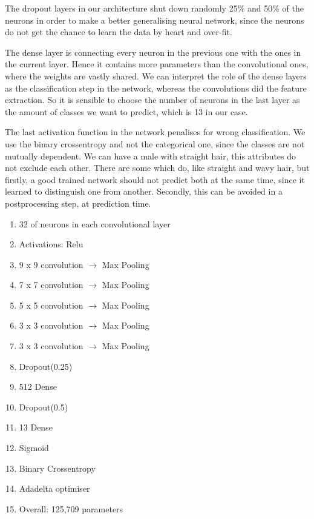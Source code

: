 \documentclass[12.5pt]{scrartcl}
\begin{document}
	The dropout layers in our architecture shut down randomly 25\% and 50\% of the neurons in order to make a better generalising neural network, since the neurons do not get the chance to learn the data by heart and over-fit.
	
	The dense layer is connecting every neuron in the previous one with the ones in the current layer. Hence it contains more parameters than the convolutional ones, where the weights are vastly shared. We can interpret the role of the dense layers as the classification step in the network, whereas the convolutions did the feature extraction. So it is sensible to choose the number of neurons in the last layer as the amount of classes we want to predict, which is 13 in our case.
	
	The last activation function in the network penalises for wrong classification. We use the binary crossentropy and not the categorical one, since the classes are not mutually dependent. We can have a male with straight hair, this attributes do not exclude each other. There are some which do, like straight and wavy hair, but firstly, a good trained network should not predict both at the same time, since it learned to distinguish one from another. Secondly, this can be avoided in a postprocessing step, at prediction time.
	
	\begin{enumerate}
		\item 	32 of neurons in each convolutional layer
		\item Activations: Relu
		\item 9 x 9 convolution $\rightarrow$ Max Pooling
		\item	7 x 7 convolution $\rightarrow$  Max Pooling
		\item	5 x 5 convolution $\rightarrow$  Max Pooling
		\item	3 x 3 convolution $\rightarrow$  Max Pooling
		\item	3 x 3 convolution $\rightarrow$  Max Pooling
		\item	Dropout(0.25)
		\item	512 Dense
		\item	Dropout(0.5)
		\item	13 Dense
		\item	Sigmoid
		\item	Binary Crossentropy
		\item	Adadelta optimiser
		\item Overall: 125,709 parameters
	\end{enumerate}
\end{document}
